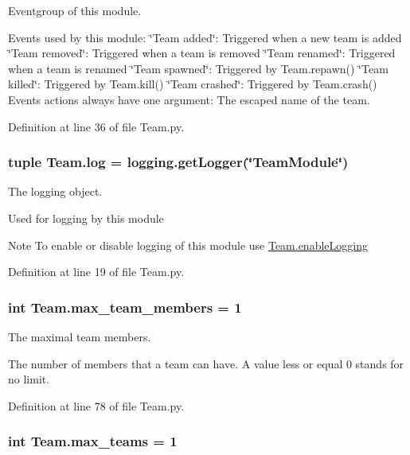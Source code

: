 Eventgroup of this module. 

Events used by this module: \char`\"{}Team added\char`\"{}: Triggered when a new team is added \char`\"{}Team removed\char`\"{}: Triggered when a team is removed \char`\"{}Team renamed\char`\"{}: Triggered when a team is renamed \char`\"{}Team spawned\char`\"{}: Triggered by Team.repawn() \char`\"{}Team killed\char`\"{}: Triggered by Team.kill() \char`\"{}Team crashed\char`\"{}: Triggered by Team.crash() Events actions always have one argument: The escaped name of the team. 

Definition at line 36 of file Team.py.

\hypertarget{namespace_team_aeda58b8cc54d371e3187f3c9af31f8cf}{
\subsubsection[{log}]{\setlength{\rightskip}{0pt plus 5cm}tuple {\bf Team.log} = logging.getLogger(\char`\"{}TeamModule\char`\"{})}}
\label{namespace_team_aeda58b8cc54d371e3187f3c9af31f8cf}


The logging object. 

Used for logging by this module \begin{DoxyNote}{Note}
To enable or disable logging of this module use \hyperlink{namespace_team_a391de1d02502546ec5d88de1632b3bc2}{Team.enableLogging} 
\end{DoxyNote}


Definition at line 19 of file Team.py.

\hypertarget{namespace_team_adf6b13168904a599042d6b67dd5e773b}{
\subsubsection[{max\_\-team\_\-members}]{\setlength{\rightskip}{0pt plus 5cm}int {\bf Team.max\_\-team\_\-members} = 1}}
\label{namespace_team_adf6b13168904a599042d6b67dd5e773b}


The maximal team members. 

The number of members that a team can have. A value less or equal 0 stands for no limit. 

Definition at line 78 of file Team.py.

\hypertarget{namespace_team_aea621f4ad9dbc98e75632e31f37c4ea4}{
\subsubsection[{max\_\-teams}]{\setlength{\rightskip}{0pt plus 5cm}int {\bf Team.max\_\-teams} = 1}}
\label{namespace_team_aea621f4ad9dbc98e75632e31f37c4ea4}


